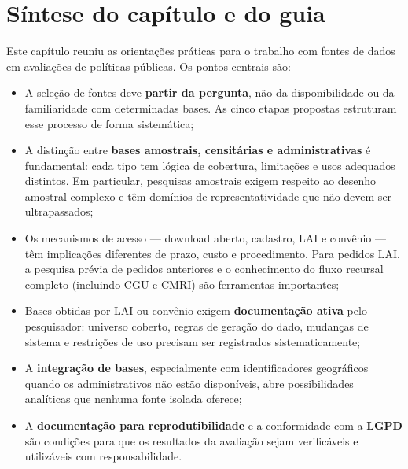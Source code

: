 \section{Síntese do capítulo e do guia}

Este capítulo reuniu as orientações práticas para o trabalho com fontes de dados em avaliações de políticas públicas. Os pontos centrais são:

\begin{itemize}
  \item A seleção de fontes deve \textbf{partir da pergunta}, não da disponibilidade ou da familiaridade com determinadas bases. As cinco etapas propostas estruturam esse processo de forma sistemática;

  \item A distinção entre \textbf{bases amostrais, censitárias e administrativas} é fundamental: cada tipo tem lógica de cobertura, limitações e usos adequados distintos. Em particular, pesquisas amostrais exigem respeito ao desenho amostral complexo e têm domínios de representatividade que não devem ser ultrapassados;

  \item Os mecanismos de acesso --- download aberto, cadastro, LAI e convênio --- têm implicações diferentes de prazo, custo e procedimento. Para pedidos LAI, a pesquisa prévia de pedidos anteriores e o conhecimento do fluxo recursal completo (incluindo CGU e CMRI) são ferramentas importantes;

  \item Bases obtidas por LAI ou convênio exigem \textbf{documentação ativa} pelo pesquisador: universo coberto, regras de geração do dado, mudanças de sistema e restrições de uso precisam ser registrados sistematicamente;

  \item A \textbf{integração de bases}, especialmente com identificadores geográficos quando os administrativos não estão disponíveis, abre possibilidades analíticas que nenhuma fonte isolada oferece;

  \item A \textbf{documentação para reprodutibilidade} e a conformidade com a \textbf{LGPD} são condições para que os resultados da avaliação sejam verificáveis e utilizáveis com responsabilidade.
\end{itemize}

\medskip

